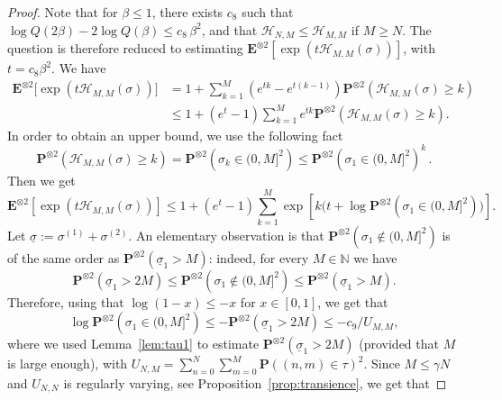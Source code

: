 \documentclass[10pt]{amsart}
\theoremstyle{definition}\newtheorem{defi}[theo]{Definition}\newtheorem{rema}[theo]{Remark}\newtheorem{exam}[theo]{Example}\newtheorem{exem}[theo]{Example}\newtheorem{nota}[theo]{Notation}
\newcommand{\cH}{\ensuremath{\mathcal{H}}}
\newcommand{\bP}{\ensuremath{\mathbf{P}}}
\newcommand{\bE}{\ensuremath{\mathbf{E}}}
\newcommand{\bbN}{\ensuremath{\mathbb{N}}}
\begin{document}
\begin{proof}
Note that for $\beta \le 1$, there exists $c_8$ such that $\log Q(2 \beta) - 2 \log Q(\beta) \le c_{8}\,\beta^ 2$, and that $\cH_{N,M} \leq \cH_{M,M}$ if $M\geq N$. The question is therefore reduced to estimating $\bE^{\otimes 2} \left[\exp (t \cH_{M,M}(\sigma)) \right]$, with $t=c_8 \beta^2$. We have
\begin{equation}
\begin{split}
\bE^{\otimes 2} \Big[\exp (t \cH_{M,M}(\sigma)) \Big] & = 1 + \sum_{k=1}^M \left(e^{tk} - e^{t (k-1)} \right) \bP^{\otimes 2} \left(\cH_{M,M}(\sigma) \ge k \right) \\
& \le 1+ (e^{t}-1) \sum_{k=1}^M e^{t k} \bP^{\otimes 2} \left(\cH_{M,M}(\sigma) \ge k \right).
\end{split}
\end{equation}
In order to obtain an upper bound, we use the following fact
\begin{equation}
\bP^{\otimes 2} \left(\cH_{M,M}(\sigma) \ge k \right) = \bP^{\otimes 2} \left(\sigma_k \in (0,M]^2\right) \le { \bP^{\otimes 2} \left(\sigma_1 \in (0,M]^2 \right) }^k\,.
\end{equation}
Then we get
\begin{equation}
\bE^{\otimes 2} \left[\exp (t \cH_{M,M}(\sigma)) \right] \le 1 + (e^{t}-1) \sum_{k=1}^M \exp \left[k \Big(t + \log \bP^{\otimes 2} \left(\sigma_1 \in (0,M]^2 \right) \Big)\right].
\end{equation}
Let $\underline{\sigma}:= \sigma^{(1)} + \sigma^{(2)}$. An elementary observation is that $\bP^{\otimes 2} \left(\sigma_1 \notin (0,M]^2 \right) $ is of the same order as $\bP^{\otimes 2} \left(\underline{\sigma}_1 >M \right) $: indeed, for every $M \in \bbN$ we have
\begin{equation}
\bP^{\otimes 2} \left(\underline{\sigma}_1 > 2 M \right) \le \bP^{\otimes 2} \left(\sigma_1 \notin (0,M]^2 \right) \le \bP^{\otimes 2} \left(\underline{\sigma}_1 > M \right).
\end{equation}
Therefore, using that $\log(1- x) \leq -x$ for $x\in [0,1]$, we get that
\begin{equation}
\log \bP^{\otimes 2} \left(\sigma_1 \in (0,M]^2 \right) \le - \bP^{\otimes 2} \left(\underline{\sigma}_1 > 2M \right) \leq - c_{9} /U_{M,M},
\end{equation}
where we used Lemma~\ref{lem:tau1} to estimate $\bP^{\otimes 2} \left(\underline{\sigma}_1 > 2M \right)$ (provided that $M$ is large enough), with $U_{N,M} =\sum_{n=0}^N \sum_{m=0}^M \bP((n,m)\in\tau)^2$. Since $M\leq \gamma N$ and $U_{N,N}$ is regularly varying, see Proposition~\ref{prop:transience}, we get that

\end{proof}
\end{document}
